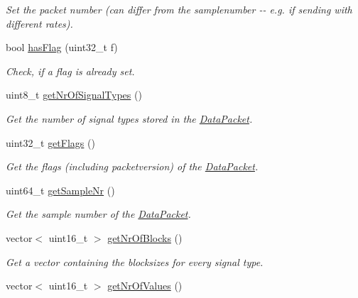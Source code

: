 \begin{DoxyCompactItemize}
\begin{DoxyCompactList}\small\item\em Set the packet number (can differ from the samplenumber -\/-\/ e.g. if sending with different rates). \item\end{DoxyCompactList}\item 
bool \hyperlink{class_data_packet_a8fed63bfc2f0903b49d88805368d2161}{hasFlag} (uint32\_\-t f)
\begin{DoxyCompactList}\small\item\em Check, if a flag is already set. \item\end{DoxyCompactList}\item 
uint8\_\-t \hyperlink{class_data_packet_ad86138bd32d1dd9b44fda5b830b6cd6a}{getNrOfSignalTypes} ()
\begin{DoxyCompactList}\small\item\em Get the number of signal types stored in the \hyperlink{class_data_packet}{DataPacket}. \item\end{DoxyCompactList}\item 
uint32\_\-t \hyperlink{class_data_packet_ab4bd49f2f36a2a15bc37235f388c33d1}{getFlags} ()
\begin{DoxyCompactList}\small\item\em Get the flags (including packetversion) of the \hyperlink{class_data_packet}{DataPacket}. \item\end{DoxyCompactList}\item 
uint64\_\-t \hyperlink{class_data_packet_a74e9c0a441f1bb05d1134cc1a10f2cb6}{getSampleNr} ()
\begin{DoxyCompactList}\small\item\em Get the sample number of the \hyperlink{class_data_packet}{DataPacket}. \item\end{DoxyCompactList}\item 
vector$<$ uint16\_\-t $>$ \hyperlink{class_data_packet_a73d518fa486ca53a334a061187063be7}{getNrOfBlocks} ()
\begin{DoxyCompactList}\small\item\em Get a vector containing the blocksizes for every signal type. \item\end{DoxyCompactList}\item 
vector$<$ uint16\_\-t $>$ \hyperlink{class_data_packet_a42a952fa11cc5247ce65e8a124eddcac}{getNrOfValues} ()

\end{DoxyCompactItemize}
